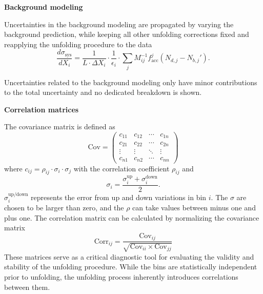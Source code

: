 \vspace{.5cm}
\noindent
\textbf{Background modeling}
\vspace{.5cm}

\noindent
Uncertainties in the background modeling are propagated by varying the background prediction, while keeping all other unfolding corrections fixed and reapplying the unfolding procedure to the data
\begin{equation}
    \frac{d\sigma_\text{sys}}{dX_i} = \frac{1}{L\cdot \Delta X_i} \cdot \frac{1}{\epsilon_i} \cdot \sum_j M_{ij}^{-1}
    f_{\text{acc}}^{j}(N_{d,j}-N_{b,j}').
\end{equation}

Uncertainties related to the background modeling only have minor contributions to the total uncertainty and no dedicated breakdown is shown.

\vspace{.5cm}
\noindent
\textbf{Correlation matrices}
\vspace{.5cm}

\noindent
The covariance matrix is defined as
\begin{equation*}
\text{Cov} = 
\begin{pmatrix}
c_{11} & c_{12} & \cdots & c_{1n} \\
c_{21} & c_{22} & \cdots & c_{2n} \\
\vdots & \vdots & \ddots & \vdots \\
c_{n1} & c_{n2} & \cdots & c_{nn}
\end{pmatrix}
\end{equation*}
where $c_{ij} = \rho_{ij} \cdot \sigma_i \cdot \sigma_j$ with the correlation coefficient $\rho_{ij}$ and
\begin{equation*}
\sigma_i = \frac{\sigma_i^{\text{up}} + \sigma_i^{\text{down}}}{2}.
\end{equation*}
$\sigma_i^\text{up/down}$ represents the error from up and down variations in bin $i$.
The $\sigma$ are chosen to be larger than zero, and the $\rho$ can take values between minus one and plus one.
The correlation matrix can be calculated by normalizing the covariance matrix
\begin{equation}
    \text{Corr}_{ij} = \frac{\text{Cov}_{ij}}{\sqrt{\text{Cov}_{ii} \times \text{Cov}_{jj}}}
\end{equation}
These matrices serve as a critical diagnostic tool for evaluating the validity and stability of the unfolding procedure.
While the bins are statistically independent prior to unfolding, the unfolding process inherently introduces correlations between them.

